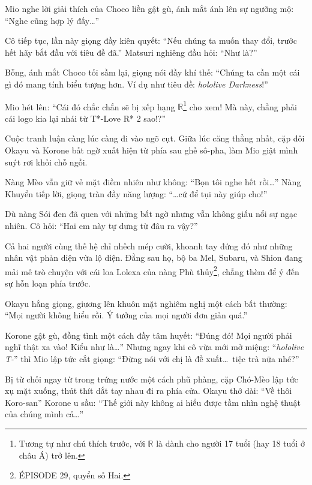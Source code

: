 \documentclass[../main.tex]{subfiles}
\begin{document}
Mio nghe lời giải thích của Choco liền gật gù, ánh mắt ánh lên sự ngưỡng mộ: ``Nghe cũng hợp lý đấy\dots''

Cô tiếp tục, lần này giọng đầy kiên quyết: ``Nếu chúng ta muốn thay đổi, trước hết hãy bắt đầu với tiêu đề đã.'' Matsuri nghiêng đầu hỏi: ``Như là?''

Bỗng, ánh mắt Choco tối sầm lại, giọng nói đầy khí thế: ``Chúng ta cần một cái gì đó mang tính biểu tượng hơn. Ví dụ như tiêu đề: \textit{hololive Darkness}!''

Mio hét lên: ``Cái đó chắc chắn sẽ bị xếp hạng \(\mathbb{R}\)\footnote{Tương tự như chú thích trước, với \(\mathbb{R}\) là dành cho người 17 tuổi (hay 18 tuổi ở châu Á) trở lên.} cho xem! Mà này, chẳng phải cái logo kia lại nhái từ T*-Love R* 2 sao!?''

\ct

Cuộc tranh luận càng lúc càng đi vào ngõ cụt. Giữa lúc căng thẳng nhất, cặp đôi Okayu và Korone bất ngờ xuất hiện từ phía sau ghế sô-pha, làm Mio giật mình suýt rơi khỏi chỗ ngồi.

Nàng Mèo vẫn giữ vẻ mặt điềm nhiên như không: ``Bọn tôi nghe hết rồi\dots'' Nàng Khuyển tiếp lời, giọng tràn đầy năng lượng: ``\dots cứ để tụi này giúp cho!''

Dù nàng Sói đen đã quen với những bất ngờ nhưng vẫn không giấu nổi sự ngạc nhiên. Cô hỏi: ``Hai em này tự dưng từ đâu ra vậy?''

Cả hai người cùng thế hệ chỉ nhếch mép cười, khoanh tay đứng đó như những nhân vật phản diện vừa lộ diện. Đằng sau họ, bộ ba Mel, Subaru, và Shion đang mải mê trò chuyện với cái loa Lolexa của nàng Phù thủy\footnote{{\flaregothic ÉPISODE 29}, quyển số Hai.}, chẳng thèm để ý đến sự hỗn loạn phía trước.


Okayu hắng giọng, giương lên khuôn mặt nghiêm nghị một cách bất thường: ``Mọi người không hiểu rồi. Ý tưởng của mọi người đơn giản quá.''

Korone gật gù, đồng tình một cách đầy tâm huyết: ``Đúng đó! Mọi người phải nghĩ thật xa vào! Kiểu như là\dots'' Nhưng ngay khi cô vừa mới mở miệng: ``\textit{hololive T-}'' thì Mio lập tức cắt giọng: ``Đừng nói với chị là đề xuất\dots\ tiệc trà nữa nhé?''

Bị từ chối ngay từ trong trứng nước một cách phũ phàng, cặp Chó-Mèo lập tức xụ mặt xuống, thút thít dắt tay nhau đi ra phía cửa. Okayu thở dài: ``Về thôi Koro-san'' Korone u sầu: ``Thế giới này không ai hiểu được tầm nhìn nghệ thuật của chúng mình cả\dots''
\end{document}
